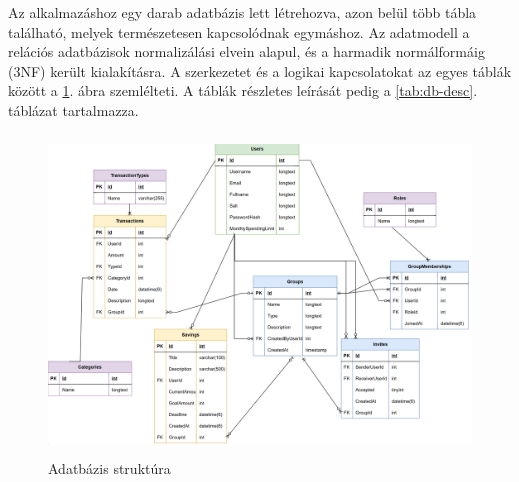 Az alkalmazáshoz egy darab adatbázis lett létrehozva, azon belül több tábla található, melyek természetesen kapcsolódnak egymáshoz. Az adatmodell a relációs adatbázisok normalizálási elvein alapul, és a harmadik normálformáig (3NF) került kialakításra.
A szerkezetet és a logikai kapcsolatokat az egyes táblák között a \ref{fig:database-structure}. ábra szemlélteti. A táblák részletes leírását pedig a \ref{tab:db-desc}. táblázat tartalmazza.

\begin{figure}[H]
	\centering
	\includegraphics[height=320px]{img/0000}
	\caption{Adatbázis struktúra}
	\label{fig:database-structure}
\end{figure}


